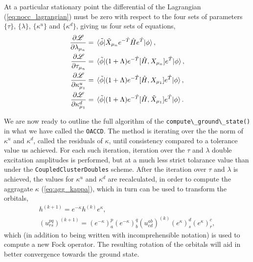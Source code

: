     At a particular stationary point the differential of the Lagrangian
    (\autoref{eq:nocc_lagrangian}) must be zero with respect to the four sets of 
    parameters $\{\tau\}$, $\{\lambda\}$, $\{\kappa^u\}$ and $\{\kappa^d\}$, giving
    us four sets of equations,
    \begin{align}
        \frac{\partial \mathscr{L}}{\partial \lambda_{\mu_n}}
            &= \mel*{\tilde{\phi}}
            {\tilde{X}_{\mu_n} e^{-\hat{T}}\hat{H}e^{\hat{T}}}
            {\phi}, \\
        \frac{\partial \mathscr{L}}{\partial \tau_{\mu_n}}
            &= \mel*{\tilde{\phi}}
            {(1 + \Lambda)e^{-\hat{T}}[\hat{H}, X_{\mu_n}]e^{\hat{T}}}
            {\phi}, \\
        \frac{\partial \mathscr{L}}{\partial \kappa^u_{\mu_1}}
            &= \mel*{\tilde{\phi}}
            {(1 + \Lambda)e^{-\hat{T}}[\hat{H}, X_{\mu_1}]e^{\hat{T}}}
            {\phi}, \\
        \frac{\partial \mathscr{L}}{\partial \kappa^d_{\mu_1}}
            &= \mel*{\tilde{\phi}}
            {(1 + \Lambda)e^{-\hat{T}}[\hat{H}, \tilde{X}_{\mu_1}]e^{\hat{T}}}
            {\phi}.
    \end{align}

    We are now ready to outline the full algorithm of the 
    \lstinline{compute\_ground\_state()} in what we have called the \lstinline{OACCD}.
    The method is iterating over the the norm of $\kappa^u$ and $\kappa^d$, called the 
    residuals of $\kappa$, until consistency compared to a tolerance value us achieved. 
    For each such iteration, iteration over the $\tau$ and $\lambda$ double excitation
    amplitudes is performed, but at a much less strict tolarance value than under the 
    \lstinline{CoupledClusterDoubles} scheme. After the iteration over $\tau$ and $\lambda$ 
    is achieved, the values for $\kappa^u$ and $\kappa^d$ are recalculated, in order to 
    compute the aggragate $\kappa$ (\autoref{eq:agg_kappa}), 
    which in turn can be used to transform the orbitals,
    \begin{equation*}
        \begin{gathered}
            h^{(k + 1)} = e^{-\kappa} h^{(k)} e^{\kappa}, \\
            (u^{pq}_{rs})^{(k + 1)}
            = (e^{-\kappa})^p_a (e^{-\kappa})^q_b 
                (u^{ab}_{cd})^{(k)}
            (e^{\kappa})^d_s (e^{\kappa})^c_r,
        \end{gathered}
    \end{equation*}
    which (in addition to being written with incomprehensible notation) is used to compute 
    a new Fock operator. The resulting rotation of the orbitals will aid in better 
    convergence towards the ground state.

